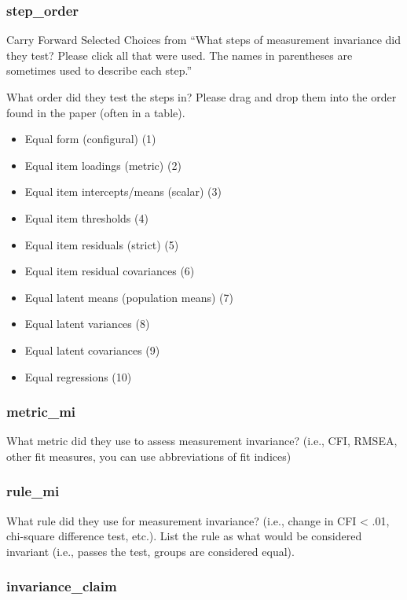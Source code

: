 \documentclass[
  english,
  man]{apa7}
\providecommand{\tightlist}{%
  \setlength{\itemsep}{0pt}\setlength{\parskip}{0pt}}
\begin{document}
\subsubsection{step\_order}\label{step_order}

Carry Forward Selected Choices from ``What steps of measurement invariance did they test? Please click all that were used. The names in parentheses are sometimes used to describe each step.''

What order did they test the steps in? Please drag and drop them into the order found in the paper (often in a table).

\begin{itemize}
\tightlist
\item
  Equal form (configural) (1)
\item
  Equal item loadings (metric) (2)
\item
  Equal item intercepts/means (scalar) (3)
\item
  Equal item thresholds (4)
\item
  Equal item residuals (strict) (5)
\item
  Equal item residual covariances (6)
\item
  Equal latent means (population means) (7)
\item
  Equal latent variances (8)
\item
  Equal latent covariances (9)
\item
  Equal regressions (10)
\end{itemize}

\subsubsection{metric\_mi}\label{metric_mi}

What metric did they use to assess measurement invariance? (i.e., CFI, RMSEA, other fit measures, you can use abbreviations of fit indices)

\subsubsection{rule\_mi}\label{rule_mi}

What rule did they use for measurement invariance? (i.e., change in CFI \textless{} .01, chi-square difference test, etc.). List the rule as what would be considered invariant (i.e., passes the test, groups are considered equal).

\subsubsection{invariance\_claim}\label{invariance_claim}
\end{document}
